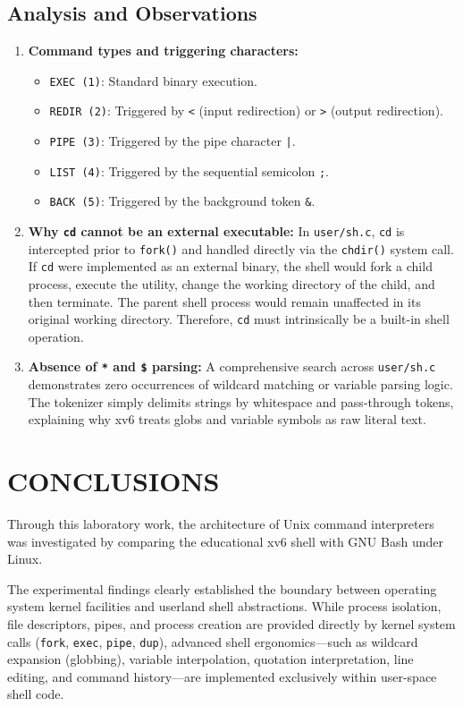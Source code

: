 \documentclass[12pt,a4paper]{report}
\numberwithin{equation}{chapter}
\numberwithin{figure}{chapter}
\numberwithin{table}{chapter}
\begin{document}
\section{Analysis and Observations}
\begin{enumerate}
    \item \textbf{Command types and triggering characters:}
    \begin{itemize}
        \item \texttt{EXEC (1)}: Standard binary execution.
        \item \texttt{REDIR (2)}: Triggered by \texttt{<} (input redirection) or \texttt{>} (output redirection).
        \item \texttt{PIPE (3)}: Triggered by the pipe character \texttt{|}.
        \item \texttt{LIST (4)}: Triggered by the sequential semicolon \texttt{;}.
        \item \texttt{BACK (5)}: Triggered by the background token \texttt{\&}.
    \end{itemize}
    \item \textbf{Why \texttt{cd} cannot be an external executable:} In \texttt{user/sh.c}, \texttt{cd} is intercepted prior to \texttt{fork()} and handled directly via the \texttt{chdir()} system call. If \texttt{cd} were implemented as an external binary, the shell would fork a child process, execute the utility, change the working directory of the child, and then terminate. The parent shell process would remain unaffected in its original working directory. Therefore, \texttt{cd} must intrinsically be a built-in shell operation.
    \item \textbf{Absence of \texttt{*} and \texttt{\$} parsing:} A comprehensive search across \texttt{user/sh.c} demonstrates zero occurrences of wildcard matching or variable parsing logic. The tokenizer simply delimits strings by whitespace and pass-through tokens, explaining why xv6 treats globs and variable symbols as raw literal text.
\end{enumerate}

\chapter{CONCLUSIONS}
Through this laboratory work, the architecture of Unix command interpreters was investigated by comparing the educational xv6 shell with GNU Bash under Linux.

The experimental findings clearly established the boundary between operating system kernel facilities and userland shell abstractions. While process isolation, file descriptors, pipes, and process creation are provided directly by kernel system calls (\texttt{fork}, \texttt{exec}, \texttt{pipe}, \texttt{dup}), advanced shell ergonomics---such as wildcard expansion (globbing), variable interpolation, quotation interpretation, line editing, and command history---are implemented exclusively within user-space shell code. 
\end{document}

